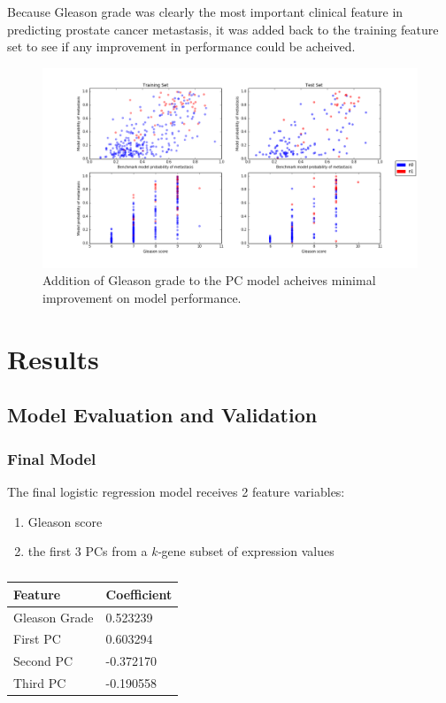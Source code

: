 \documentclass[final]{article}
\begin{document}
Because Gleason grade was clearly the most important clinical feature in predicting
prostate cancer metastasis, it was added back to the training feature set to see
if any improvement in performance could be acheived.

\begin{figure}
  \centering
  \includegraphics[width=\textwidth]{PC3Gleason}
  \caption{\label{fig:PC3GG}Addition of Gleason grade to the PC model acheives minimal improvement on model performance.}
\end{figure}

\section{Results}

\subsection{Model Evaluation and Validation}

\subsubsection{Final Model}

The final logistic regression model receives 2 feature variables:

\begin{enumerate}
\item Gleason score
\item the first 3 PCs from a \textit{k-}gene subset of expression values
\end{enumerate}

\begin{table}
  \centering
  \caption{\label{tab:FFcoefs}}
    \begin{tabular}{l l}
      \hline
      Feature & Coefficient \\ \hline
      Gleason Grade & 0.523239  \\
      First PC & 0.603294 \\
      Second PC & -0.372170  \\
      Third PC &  -0.190558 \\
      \hline
    \end{tabular}
\end{table}
\end{document}
